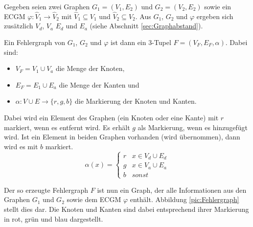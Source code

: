 \begin{mydef}[Fehlergraph]
Gegeben seien zwei Graphen $G_1=(V_1,E_2)$ und $G_2=(V_2,E_2)$ sowie ein ECGM 
$\varphi:\hat{V}_1 \rightarrow \hat{V}_2$ mit $\hat{V}_1 \subseteq V_1$ und 
$\hat{V}_2 \subseteq V_2$. Aus $G_1$, $G_2$ und $\varphi$ ergeben sich zusätzlich 
$V_d$, $V_a$ $E_d$ und $E_a$ (siehe Abschnitt \ref{sec:Graphabstand}).

Ein Fehlergraph von $G_1$, $G_2$ und $\varphi$ ist dann ein 3-Tupel $F=(V_F,E_F,\alpha)$. 
Dabei sind:
\begin{itemize}
	\item $V_F=V_1 \cup V_a$ die Menge der Knoten,
	\item $E_F=E_1 \cup E_a$ die Menge der Kanten und
	\item $\alpha: V \cup E \rightarrow \{r,g,b\}$ die Markierung der Knoten und Kanten.
\end{itemize}

Dabei wird ein Element des Graphen (ein Knoten oder eine Kante) mit $r$ markiert, 
wenn es entfernt wird. Es erhält $g$ als Markierung, wenn es hinzugefügt wird. 
Ist ein Element in beiden Graphen vorhanden (wird übernommen), dann wird es mit $b$ 
markiert.
\[
\alpha(x)=\left\{\begin{array}{ll}
                    r & x \in V_d \cup E_d \\
                    g & x \in V_a \cup E_a \\
                    b & sonst
                 \end{array}\right.
\]
\end{mydef}

Der so erzeugte Fehlergraph $F$ ist nun ein Graph, der alle Informationen aus den Graphen 
$G_1$ und $G_2$ sowie dem ECGM $\varphi$ enthält. Abbildung \ref{pic:Fehlergraph} stellt dies dar. 
Die Knoten und Kanten sind dabei entsprechend ihrer Markierung in rot, grün und blau 
dargestellt.


